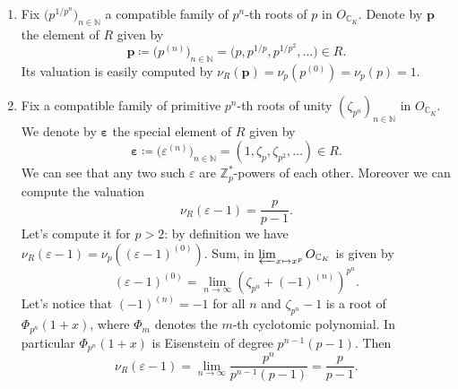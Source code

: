 \begin{ntt}[]\leavevmode\vspace{-.2\baselineskip}\label{not:ExampleEltsTilt}
\begin{enumerate}
\item Fix $\big( p^{1/p^n} \big)_{n \in \mathbb{N}}$ 
	a compatible family of $p^n$-th roots of $p$
	in $O_{\mathbb{C}_K}$.
	Denote by $\mathbf{p}$ the element of $R$ given by
	\begin{equation*}
		\mathbf{p} \coloneqq \big( p^{(n)} \big)_{n \in \mathbb{N}} =
		\big( p, p^{1/p}, p^{1/p^2}, \ldots \big) \in R
	.\end{equation*}
	Its valuation is easily computed by
	$\nu_R(\mathbf{p}) = \nu_p(p^{(0)}) = \nu_p(p) = 1$.

\item Fix a compatible family of primitive $p^n$-th roots of unity
	$\left( \zeta_{p^n} \right)_{n \in \mathbb{N}}$ in $O_{\mathbb{C}_K}$.
	We denote by $\boldsymbol\varepsilon$ the special element of $R$ given by
	\begin{equation*}
		\boldsymbol\varepsilon \coloneqq \big( \varepsilon^{(n)} \big)_{n \in \mathbb{N}} =
		\left( 1, \zeta_p, \zeta_{p^2}, \ldots \right) \in R
	.\end{equation*}
	We can see that any two such $\varepsilon$
	are $\mathbb{Z}_{p}^*$-powers of each other.
	Moreover we can compute the valuation
	\begin{equation*}
		\nu_R \left( \varepsilon - 1 \right) = \frac{ p }{ p - 1 }
	.\end{equation*}
	Let's compute it for $p > 2$: by definition we have
	$\nu_R(\varepsilon - 1) = \nu_p \left( (\varepsilon -1 )^{(0)} \right)$.
	Sum, in $\varprojlim_{x \mapsto x^p} O_{\mathbb{C}_K}$
	is given by
	\begin{equation*}
		\left( \varepsilon -1 \right)^{(0)} =
		\lim_{n \to \infty} \left( \zeta_{p^n} + (-1)^{(n)} \right)^{p^n}
	.\end{equation*}
	Let's notice that $\left( -1 \right)^{(n)} = -1$ for all $n$
	and $\zeta_{p^n} - 1$ is a root of $\Phi_{p^n}(1+x)$,
	where $\Phi_m$ denotes the $m$-th cyclotomic polynomial.
	In particular $\Phi_{p^n}(1+x)$ is Eisenstein of degree
	$p^{n-1}(p-1)$.
	Then
	\begin{equation*}
		\nu_R(\varepsilon - 1) =
		\lim_{n \to \infty} \frac{ p^n }{ p^{n-1}(p-1) } =
		\frac{ p }{ p-1 }
	.\end{equation*}
\end{enumerate}
\end{ntt}


